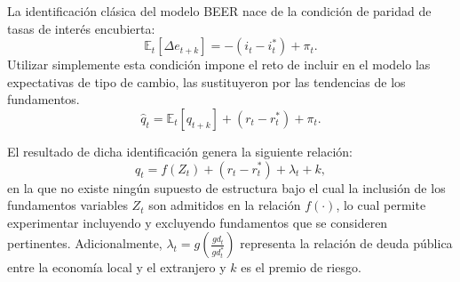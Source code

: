 \documentclass[12pt,letterpaper]{article}
\begin{document}
La identificación clásica del modelo BEER nace de la condición de paridad de tasas de interés encubierta:
\begin{equation}
\mathbb{E}_t[\Delta e_{t+k}]=-(i_t-i_t^*)+\pi_t.
\end{equation}
Utilizar simplemente esta condición impone el reto de incluir en el modelo las expectativas de tipo de cambio, \cite{clark1999exchange} las sustituyeron por las tendencias de los fundamentos.
\begin{equation}
\hat{q}_t=\mathbb{E}_t[q_{t+k}]+(r_t-r_t^*)+\pi_t.
\end{equation}


El resultado de dicha identificación genera la siguiente relación:
\begin{equation}\label{qb}
q_t=f(Z_t)+(r_t-r_t^*)+\lambda_t+k,
\end{equation}
en la que no existe ningún supuesto de estructura bajo el cual la inclusión de los fundamentos variables $Z_t$ son admitidos en la relación $f(\cdot)$, lo cual permite experimentar incluyendo y excluyendo fundamentos que se consideren pertinentes. Adicionalmente, $\lambda_t=g(\frac{gd_t}{gd_t^*})$ representa la relación de deuda pública entre la economía local y el extranjero y $k$ es el premio de riesgo. 
\end{document}
